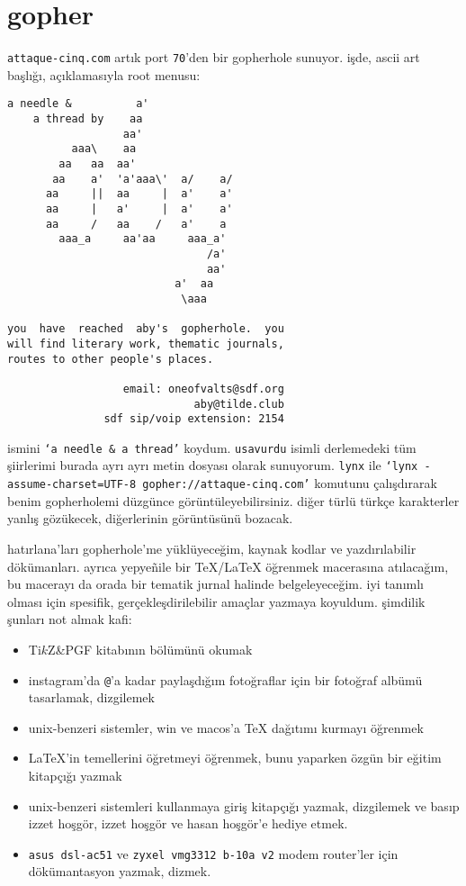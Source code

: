 \documentclass[a4paper, twocolumn]{memoir}
\begin{document}
\section{gopher}
\texttt{attaque-cinq.com} artık port \texttt{70}'den bir gopherhole
sunuyor. işde, ascii art başlığı, açıklamasıyla root menusu:
\begin{verbatim}
a needle &          a'
    a thread by    aa
                  aa'
          aaa\    aa
        aa   aa  aa'
       aa    a'  'a'aaa\'  a/    a/
      aa     ||  aa     |  a'    a'
      aa     |   a'     |  a'    a'
      aa     /   aa    /   a'    a
        aaa_a     aa'aa     aaa_a'
                               /a'
                               aa'
                          a'  aa
                           \aaa

you  have  reached  aby's  gopherhole.  you
will find literary work, thematic journals,
routes to other people's places.

                  email: oneofvalts@sdf.org
                             aby@tilde.club
               sdf sip/voip extension: 2154
\end{verbatim}
ismini \texttt{`a needle \& a thread'} koydum. \texttt{usavurdu} isimli
derlemedeki tüm şiirlerimi burada ayrı ayrı metin dosyası olarak
sunuyorum. \texttt{lynx} ile \texttt{`lynx -assume-charset=UTF-8
gopher://attaque-cinq.com'} komutunu çalışdırarak benim gopherholemi
düzgünce görüntüleyebilirsiniz. diğer türlü türkçe karakterler yanlış
gözükecek, diğerlerinin görüntüsünü bozacak.

hatırlana'ları gopherhole'me yüklüyeceğim, kaynak kodlar ve
yazdırılabilir dökümanları. ayrıca yepye\~nile bir \TeX/\LaTeX{} öğrenmek
macerasına atılacağım, bu macerayı da orada bir tematik jurnal halinde
belgeleyeceğim. iyi tanımlı olması için spesifik, gerçekleşdirilebilir
amaçlar yazmaya koyuldum. şimdilik şunları not almak kafi:
\begin{itemize}
  \item Ti$k$Z\&PGF kitabının  bölümünü
    okumak
  \item instagram'da \texttt{@}'a kadar paylaşdığım fotoğraflar için bir
    fotoğraf albümü tasarlamak, dizgilemek
  \item unix-benzeri sistemler, win ve macos'a \TeX{} dağıtımı kurmayı
    öğrenmek
  \item \LaTeX'in temellerini öğretmeyi öğrenmek, bunu yaparken özgün bir
    eğitim kitapçığı yazmak
  \item unix-benzeri sistemleri kullanmaya giriş kitapçığı yazmak,
    dizgilemek ve basıp izzet hoşgör, izzet hoşgör ve hasan hoşgör'e
    hediye etmek.
  \item \texttt{asus dsl-ac51} ve \texttt{zyxel vmg3312 b-10a v2} modem
    router'ler için dökümantasyon yazmak, dizmek.
\end{itemize}
\end{document}
